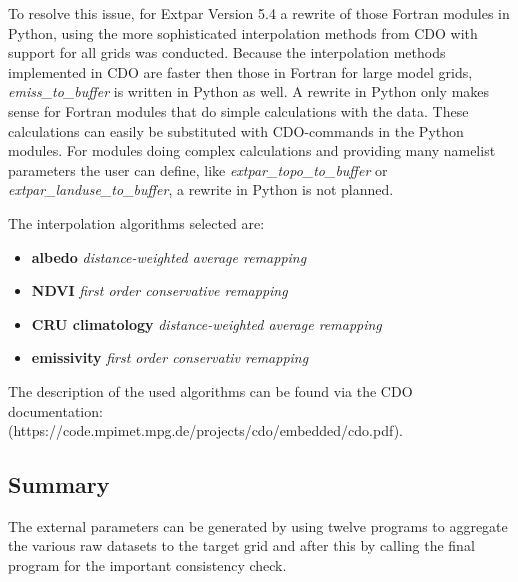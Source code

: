 \documentclass[a4paper,10pt,DIV14,BCOR1cm,titlepage,twoside]{scrartcl}
\begin{document}
\noindent To resolve this issue, for Extpar Version 5.4 a rewrite of those Fortran modules in Python, using the more sophisticated interpolation methods
from CDO with support for all grids was conducted.  Because the interpolation methods implemented in CDO are faster then those
in Fortran for large model grids, \textit{emiss\_to\_buffer} is written in Python as well. A rewrite in Python only makes sense for Fortran modules that do simple calculations with the data. These calculations can easily be substituted with CDO-commands in the Python modules.
For modules doing complex calculations and providing many namelist parameters the user can define, like \textit{extpar\_topo\_to\_buffer} or \textit{extpar\_landuse\_to\_buffer}, a rewrite in Python is not planned.
\par\medskip\noindent

\noindent The interpolation algorithms selected are:

\begin{itemize}
\item \textbf{albedo} \textit{distance-weighted average remapping}
\item \textbf{NDVI} \textit{first order conservative remapping}
\item \textbf{CRU climatology} \textit{distance-weighted average remapping}
\item \textbf{emissivity} \textit{first order conservativ remapping}
\end{itemize}

The description of the used algorithms can be found via the CDO
documentation: 
\\
(https://code.mpimet.mpg.de/projects/cdo/embedded/cdo.pdf).
\\



\subsection{Summary}\label{Summary}
The external parameters can be generated by using twelve programs to aggregate the various raw datasets to the target grid and after this by calling the final program for the important consistency check.
\end{document}
